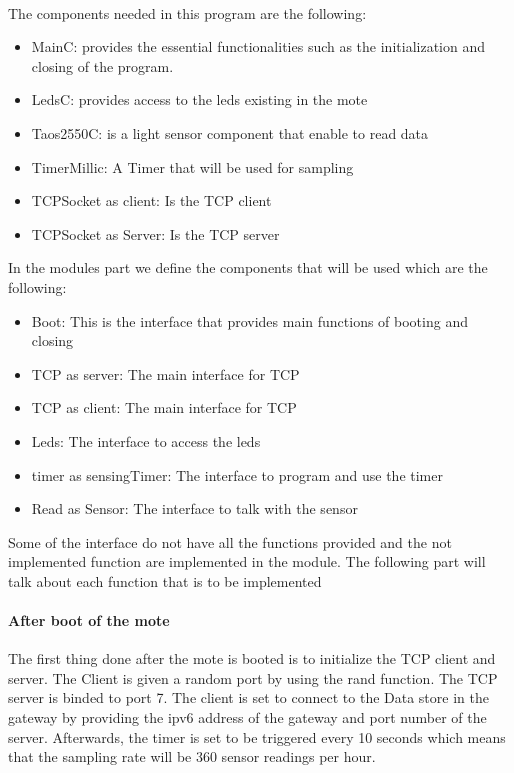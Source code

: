 \documentclass[oneside,12pt,a4paper,final]{book}
\begin{document}
\paragraph{}
The components needed in this program are the following:
\begin{itemize}
\item MainC: provides the essential functionalities such as the initialization and closing of the program.
\item LedsC: provides access to the leds existing in the mote
\item Taos2550C: is a light sensor component that enable to read data
\item TimerMillic: A Timer that will be used for sampling
\item TCPSocket as client: Is the TCP client
\item TCPSocket as Server: Is the TCP server
\end{itemize}
In the modules part we define the components that will be used which are the following:
\begin{itemize}
\item Boot: This is the interface that provides main functions of booting and closing
\item TCP as server: The main interface for TCP
\item TCP as client: The main interface for TCP
\item Leds: The interface to access the leds
\item timer as sensingTimer: The interface to program and use the timer
\item Read as Sensor: The interface to talk with the sensor
\end{itemize}
Some of the interface do not have all the functions provided and the not implemented function are implemented in the module. The following part will talk about each function that is to be implemented
\paragraph{After boot of the mote}
The first thing done after the mote is booted is to initialize the TCP client and server. The Client is given a random port by using the rand function. The TCP server is binded to port 7. The client is set to connect to the Data store in the gateway by providing the \gls{ipv6} address of the gateway and port number of the server. Afterwards, the timer is set to be triggered every 10 seconds which means that the sampling rate will be 360 sensor readings per hour. 
\end{document}
